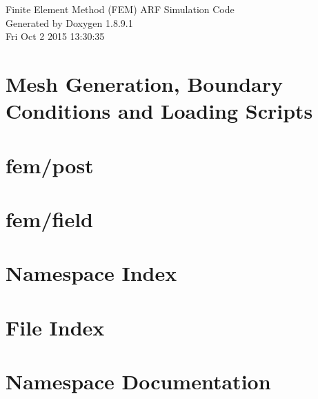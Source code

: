 \documentclass[twoside]{book}
\newcommand{\+}{\discretionary{\mbox{\scriptsize$\hookleftarrow$}}{}{}}
\newcommand{\clearemptydoublepage}{%
  \newpage{\pagestyle{empty}\cleardoublepage}%
}
\begin{document}
\hypersetup{pageanchor=false,
             bookmarks=true,
             bookmarksnumbered=true,
             pdfencoding=unicode
            }
\begin{titlepage}
\vspace*{7cm}
\begin{center}%
{\Large Finite Element Method (F\+E\+M) A\+R\+F Simulation Code }\\
\vspace*{1cm}
{\large Generated by Doxygen 1.8.9.1}\\
\vspace*{0.5cm}
{\small Fri Oct 2 2015 13:30:35}\\
\end{center}
\end{titlepage}
\clearemptydoublepage
\tableofcontents
\clearemptydoublepage
{}
\hypersetup{pageanchor=true}

\chapter{Mesh Generation, Boundary Conditions and Loading Scripts}
\label{md_mesh_README}
\hypertarget{md_mesh_README}{}

\chapter{fem/post}
\label{md_post_README}
\hypertarget{md_post_README}{}

\chapter{fem/field}
\label{md_field_README}
\hypertarget{md_field_README}{}

\chapter{Namespace Index}

\chapter{File Index}

\chapter{Namespace Documentation}













\end{document}
